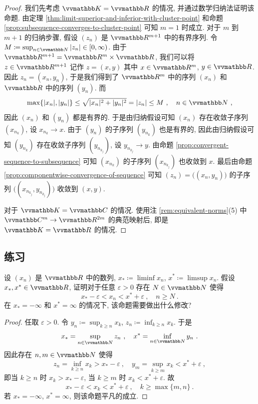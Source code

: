 \begin{proof}
    我们先考虑 \(\K = \R\) 的情况, 并通过数学归纳法证明该命题. 由定理 \ref{thm:limit-superior-and-inferior-with-cluster-point} 和命题 \ref{prop:subsequence-converges-to-cluster-point} 可知 \(m = 1\) 时成立. 对于 \(m\) 到 \(m + 1\) 的归纳步骤, 假设 \((z_n)\) 是 \(\R^{m + 1}\) 中的有界序列. 令 \(M \coloneqq \sup_{n \in \N} |z_n| \in [0, \infty)\). 由于 \(\R^{m + 1} = \R^m \times \R\), 我们可以将 \(z \in \R^{m + 1}\) 记作 \(z = (x, y)\) 其中 \(x \in \R^m\), \(y \in \R\). 因此 \(z_n = (x_n, y_n)\), 于是我们得到了 \(\R^m\) 中的序列 \((x_n)\) 和 \(\R\) 中的序列 \((y_n)\). 而
    \[
        \max\{|x_n|, |y_n|\} \leq \sqrt{|x_n|^2 + |y_n|^2} = |z_n| \leq M\ ,\quad n \in \N\ ,
    \]
    因此 \((x_n)\) 和 \((y_n)\) 都是有界的. 于是由归纳假设可知 \((x_n)\) 存在收敛子序列 \((x_{n_k})\), 设 \(x_{n_k} \to x\). 由于 \((y_n)\) 的子序列 \((y_{n_k})\) 也是有界的, 因此由归纳假设可知 \((y_{n_k})\) 存在收敛子序列 \((y_{n_{k_j}})\), 设 \(y_{n_{k_j}} \to y\). 由命题 \ref{prop:convergent-sequence-to-subsequence} 可知 \((x_{n_k})\) 的子序列 \((x_{n_{k_j}})\) 也收敛到 \(x\). 最后由命题 \ref{prop:componentwise-convergence-of-sequence} 可知 \((z_n) = \bigl((x_n, y_n)\bigr)\) 的子序列 \(\bigl((x_{n_{k_j}}, y_{n_{k_j}})\bigr)\) 收敛到 \((x, y)\).

    对于 \(\K = \C\) 的情况. 使用注 \ref{rem:equivalent-norms}(5) 中 \(\C^m \to \R^{2 m}\) 的典范映射后, 即是 \(\K = \R\) 的情况.
\end{proof}

\subsection{练习}

\begin{exercise}\label{ex:limit-superior-and-inferior-with-item-of-sequence}
    设 \((x_n)\) 是 \(\R\) 中的数列, \(x_\ast \coloneqq \liminf x_n\), \(x^\ast \coloneqq \limsup x_n\). 假设 \(x_\ast, x^\ast \in \R\), 证明对于任意 \(\varepsilon > 0\) 存在 \(N \in \N\) 使得
    \[
        x_\ast - \varepsilon < x_n < x^\ast + \varepsilon\ ,\quad n \geq N\ .
    \]
    在 \(x_\ast = - \infty\) 和 \(x^\ast = \infty\) 的情况下, 该命题需要做出什么修改?
\end{exercise}

\begin{proof}
    任取 \(\varepsilon > 0\). 令 \(y_n \coloneqq \sup_{k \geq n} x_k\), \(z_n \coloneqq \inf_{k \geq n} x_k\). 于是
    \[
        x_\ast = \sup_{n \in \N} z_n\ ,\quad x^\ast = \inf_{n \in \N} y_n\ .
    \]
    因此存在 \(n, m \in \N\) 使得
    \[
        z_n = \inf_{k \geq n} x_k > x_\ast - \varepsilon\ ,\quad y_m = \sup_{k \geq m} x_k < x^\ast + \varepsilon\ ,
    \]
    即当 \(k \geq n\) 时 \(x_k > x_\ast - \varepsilon\), 当 \(k \geq m\) 时 \(x_k < x^\ast + \varepsilon\). 故
    \[
        x_\ast - \varepsilon < x_k < x^\ast + \varepsilon\ ,\quad k \geq \max\{m, n\}\ .
    \]
    若 \(x_\ast = - \infty\), \(x^\ast = \infty\), 则该命题平凡的成立.
\end{proof}

